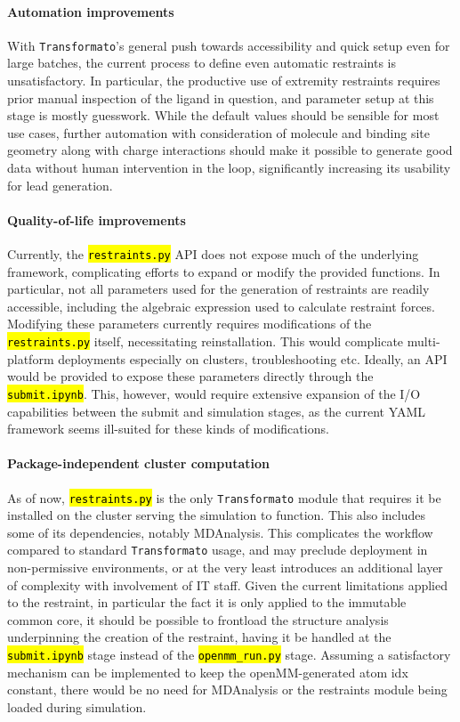 \documentclass[oneside]{scrreprt}
\newcommand{\code}[1]{\texttt{\hl{#1}}}
\begin{document}
\paragraph{Automation improvements} With \texttt{Transformato}'s general push towards accessibility and quick setup even for large batches, the current process to define even automatic restraints is unsatisfactory. In particular, the productive use of extremity restraints requires prior manual inspection of the ligand in question, and parameter setup at this stage is mostly guesswork. While the default values should be sensible for most use cases, further automation with consideration of molecule and binding site geometry along with charge interactions should make it possible to generate good data without human intervention in the loop, significantly increasing its usability for lead generation.
\paragraph{Quality-of-life improvements} Currently, the \code{restraints.py} API does not expose much of the underlying framework, complicating efforts to expand or modify the provided functions. In particular, not all parameters used for the generation of restraints are readily accessible, including the algebraic expression used to calculate restraint forces. Modifying these parameters currently requires modifications of the \code{restraints.py} itself, necessitating reinstallation. This would complicate multi-platform deployments especially on clusters, troubleshooting etc. Ideally, an API would be provided to expose these parameters directly through the \code{submit.ipynb}. This, however, would require extensive expansion of the I/O capabilities between the submit and simulation stages, as the current YAML framework seems ill-suited for these kinds of modifications.
\paragraph{Package-independent cluster computation} As of now, \code{restraints.py} is the only \texttt{Transformato} module that requires it be installed on the cluster serving the simulation to function. This also includes some of its dependencies, notably MDAnalysis. This complicates the workflow compared to standard \texttt{Transformato} usage, and may preclude deployment in non-permissive environments, or at the very least introduces an additional layer of complexity with involvement of IT staff. Given the current limitations applied to the restraint, in particular the fact it is only applied to the immutable common core, it should be possible to frontload the structure analysis underpinning the creation of the restraint, having it be handled at the \code{submit.ipynb} stage instead of the \code{openmm\_run.py} stage. Assuming a satisfactory mechanism can be implemented to keep the openMM-generated atom idx constant, there would be no need for MDAnalysis or the restraints module being loaded during simulation.
\end{document}

